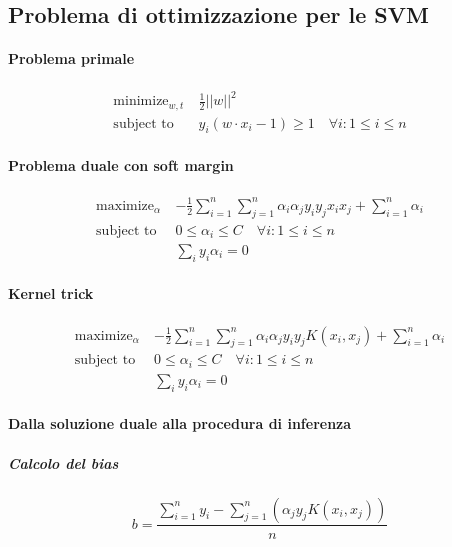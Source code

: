 \documentclass[12pt]{article}
\begin{document}
\subsection{Problema di ottimizzazione per le SVM}

\paragraph{Problema primale}

\begin{align*}
  \text{minimize}_{w, t}\ & \frac{1}{2}||w||^2 \\
  \text{subject to } & y_i(w \cdot x_i - 1)\geq 1 \quad \forall i:1\leq i\leq n
\end{align*}

\paragraph{Problema duale con soft margin}

\begin{align*}
  \text{maximize}_\alpha\ & -\frac{1}{2}\sum_{i=1}^n\sum_{j=1}^n\alpha_i\alpha_jy_iy_jx_ix_j + \sum_{i=1}^n
\alpha_i \\
  \text{subject to } & 0 \leq \alpha_i \leq C \quad \forall i: 1\leq i\leq n \\
  & \sum_iy_i\alpha_i=0
\end{align*}

\paragraph{Kernel trick}

\begin{align*}
  \text{maximize}_\alpha\ & -\frac{1}{2}\sum_{i=1}^n\sum_{j=1}^n\alpha_i\alpha_jy_iy_jK(x_i, x_j) + \sum_{i=1}^n
\alpha_i \\
  \text{subject to } & 0 \leq \alpha_i \leq C \quad \forall i: 1\leq i\leq n \\
  & \sum_iy_i\alpha_i=0
\end{align*}

\paragraph{Dalla soluzione duale alla procedura di inferenza}

\subparagraph{Calcolo del bias}

$$b = \frac{\sum_{i=1}^n y_i - \sum_{j=1}^n(\alpha_jy_jK(x_i,x_j))}{n}$$
\end{document}
